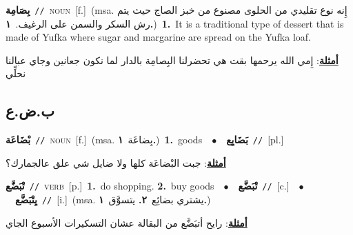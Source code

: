 \documentclass[10pt,a4paper,twoside]{article} %
\begin{document}
\begin{multicols}{2}
{\setlength\topsep{0pt}\textbf{\foreignlanguage{arabic}{بِصَامِة}}\ {\color{gray}\texttt{//}\color{black}}\ \textsc{noun}\ [f.]\ \color{gray}(msa. \foreignlanguage{arabic}{إِنه نوع تقليدي من الحلوى مصنوع من خبز الصاج حيث يتم رش السكر والسمن على الرغيف.}~\foreignlanguage{arabic}{\textbf{١.}})\color{black}\ \textbf{1.}~It is a traditional type of dessert that is made of  Yufka where sugar and margarine are spread on the Yufka loaf.\  \begin{flushright}\color{gray}\foreignlanguage{arabic}{\textbf{\underline{\foreignlanguage{arabic}{أمثلة}}}: إِمي الله يرحمها بقت هي تحضرلنا البِصامِة بالدار لما نكون جعانين وجاي عبالنا نحلِّي}\end{flushright}\color{black}} \vspace{2mm}

\vspace{-3mm}
\subsection*{\color{blue}\foreignlanguage{arabic}{ب.ض.ع}\color{blue}{}} 

{\setlength\topsep{0pt}\textbf{\foreignlanguage{arabic}{بْضَاعَة}}\ {\color{gray}\texttt{//}\color{black}}\ \textsc{noun}\ [f.]\ \color{gray}(msa. \foreignlanguage{arabic}{بِضاعَة}~\foreignlanguage{arabic}{\textbf{١.}})\color{black}\ \textbf{1.}~goods\ \ $\bullet$\ \ \setlength\topsep{0pt}\textbf{\foreignlanguage{arabic}{بَضَايِع}}\ {\color{gray}\texttt{//}\color{black}}\ [pl.]\  \begin{flushright}\color{gray}\foreignlanguage{arabic}{\textbf{\underline{\foreignlanguage{arabic}{أمثلة}}}: جبت البْضاعَة كلها ولا ضايل شي علق عالجمارك؟}\end{flushright}\color{black}} \vspace{2mm}

{\setlength\topsep{0pt}\textbf{\foreignlanguage{arabic}{تْبَضَّع}}\ {\color{gray}\texttt{//}\color{black}}\ \textsc{verb}\ [p.]\ \textbf{1.}~do shopping.  \textbf{2.}~buy goods\ \ $\bullet$\ \ \setlength\topsep{0pt}\textbf{\foreignlanguage{arabic}{تْبَضَّع}}\ {\color{gray}\texttt{//}\color{black}}\ [c.]\ \ $\bullet$\ \ \setlength\topsep{0pt}\textbf{\foreignlanguage{arabic}{يِتْبَضَّع}}\ {\color{gray}\texttt{//}\color{black}}\ [i.]\ \color{gray}(msa. \foreignlanguage{arabic}{يشتري بضائِع}~\foreignlanguage{arabic}{\textbf{٢.}}  \foreignlanguage{arabic}{يتسوَّق}~\foreignlanguage{arabic}{\textbf{١.}})\color{black}\  \begin{flushright}\color{gray}\foreignlanguage{arabic}{\textbf{\underline{\foreignlanguage{arabic}{أمثلة}}}: رايح أتبَضَّع من البقالة عشان التسكيرات الأسبوع الجاي}\end{flushright}\color{black}} \vspace{2mm}


\end{multicols}
\end{document}
